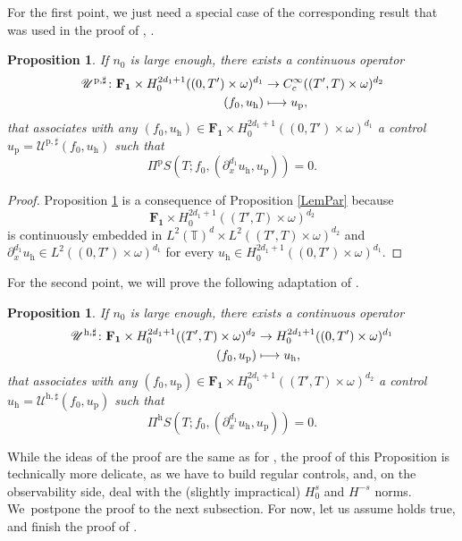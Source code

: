 \documentclass[JEP,XML,SOM,Unicode,NoEqCountersInSection]{cedram}
\let\mathcal\mathscr
\def\mto{\mathchoice{\longmapsto}{\mapsto}{\mapsto}{\mapsto}}
\theoremstyle{plain}
\newtheorem{prop}[theorem]{Proposition}
\theoremstyle{definition}
\theoremstyle{remark}
\newcommand{\set}{\mathbb}
\newcommand{\T}{\set{T}}
\newcommand{\h}{{\mathrm h}}
\newcommand{\p}{{\mathrm p}}
\begin{document}
For the first point, we just need a special case of the corresponding result that was used in the proof of , \ie {}.
\begin{prop}
\label{LemPar_BIS1}
If $n_0$ is large enough, there exists a continuous operator
\begin{align*}
\mathcal U^{\p,\sharp} \colon \mathbf{F_1} \times H^{2d_1+1}_0((0,T')\times\omega)^{d_1} & \to C^\infty_c((T',T)\times\omega)^{d_2} \\
(f_0,u_{\h}) &\mto u_{\p},
\end{align*}
that associates with any $(f_0,u_{\h})\in \mathbf{F_1} \times H^{2d_1+1}_0((0,T')\times\omega)^{d_1} $ a control $u_{\p}=\mathcal U^{\p,\sharp}(f_0,u_{\h})$ such that
\begin{equation*}
\Pi^{\p} S(T;f_0, (\partial_x^{d_1} u_{\h},u_{\p})) = 0.
\end{equation*}
\end{prop}
\begin{proof}
Proposition \ref{LemPar_BIS1} is a consequence of Proposition \ref{LemPar} because
\[
\mathbf{F_1} \times H^{2d_1+1}_0((T',T)\times\omega)^{d_2}
\]
is continuously embedded in $L^2(\T)^d \times L^2((T',T)\times \omega)^{d_2}$ and $\partial_x^{d_1} u_{\h} \in L^2((0,T')\times\omega)^{d_1}$ for every $u_{\h} \in H^{2d_1+1}_0((0,T')\times\omega)^{d_1}$.
\end{proof}

For the second point, we will prove the following adaptation of .
\begin{prop}
\label{LemHyp_BIS1}
If $n_0$ is large enough, there exists a continuous operator
\begin{align*}
\mathcal U^{\h,\sharp} \colon
\mathbf{F_1} \times H_0^{2d_1+1}((T',T)\times\omega)^{d_2} & \to H^{2d_1+1}_0((0,T')\times\omega)^{d_1}\\
(f_0,u_{\p}) &\mto u_{\h},
\end{align*}
that associates with any $(f_0,u_{\p})\in \mathbf{F_1} \times H^{2d_1+1}_0((T',T)\times\omega)^{d_2} $ a control $u_{\h}=\mathcal U^{\h,\sharp}(f_0,u_{\p})$ such that
\begin{equation}\label{eq:LemHyp_BIS1}
\Pi^{\h} S(T;f_0, (\partial_x^{d_1} u_{\h},u_{\p})) = 0.
\end{equation}
\end{prop}
While the ideas of the proof are the same as for , the proof of this Proposition is technically more delicate, as we have to build regular controls, and, on the observability side, deal with the (slightly impractical) $H^s_0$ and $H^{-s}$ norms. We~postpone the proof to the next subsection. For now, let us assume  holds true, and finish the proof of .
\end{document}
